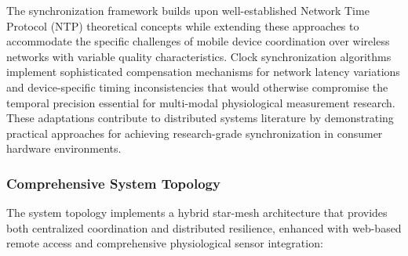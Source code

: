 \documentclass[11pt,a4paper]{article}
\begin{document}
The synchronization framework builds upon well-established Network Time Protocol (NTP) theoretical concepts while
extending these approaches to accommodate the specific challenges of mobile device coordination over wireless networks
with variable quality characteristics. Clock synchronization algorithms implement sophisticated compensation mechanisms
for network latency variations and device-specific timing inconsistencies that would otherwise compromise the temporal
precision essential for multi-modal physiological measurement research. These adaptations contribute to distributed
systems literature by demonstrating practical approaches for achieving research-grade synchronization in consumer
hardware environments.

\subsubsection{Comprehensive System Topology}

The system topology implements a hybrid star-mesh architecture that provides both centralized coordination and
distributed resilience, enhanced with web-based remote access and comprehensive physiological sensor integration:
\end{document}
